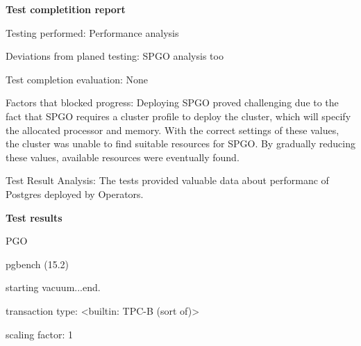 


\textbf{Test completition report}

Testing performed: Performance analysis

Deviations from planed testing: SPGO analysis too

Test completion evaluation: None

Factors that blocked progress: Deploying SPGO proved challenging due to the fact that SPGO requires a cluster profile to deploy the cluster, which will specify the allocated processor and memory. With the correct settings of these values, the cluster was unable to find suitable resources for SPGO. By gradually reducing these values, available resources were eventually found.

Test Result Analysis: The tests provided valuable data about performanc of Postgres deployed by Operators.

\textbf{Test results}

PGO

pgbench (15.2)

starting vacuum...end.

transaction type: <builtin: TPC-B (sort of)>

scaling factor: 1

